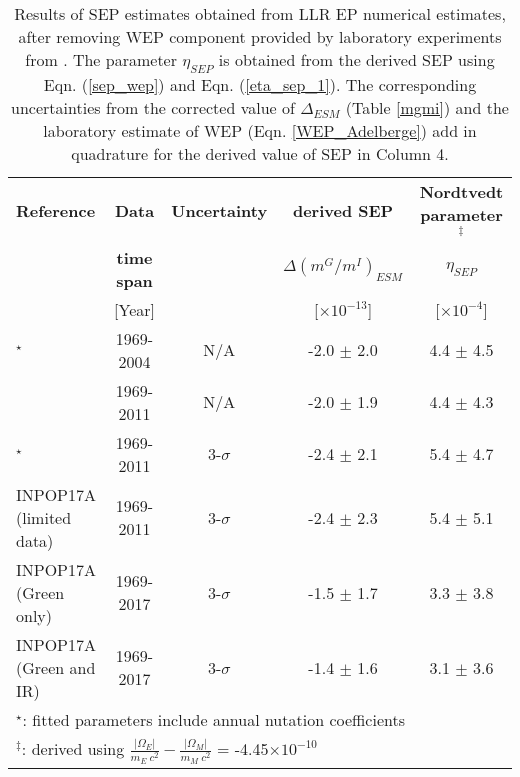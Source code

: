 \documentclass[fleqn,usenatbib,referee]{mnras}
\begin{document}
  \begin{table*}
  \caption{Results of SEP estimates obtained from LLR EP numerical estimates, after removing WEP component provided by laboratory experiments from \protect\cite{Adelberger2001}. The parameter $\eta_{SEP}$ is obtained from the derived SEP using Eqn. (\ref{sep_wep}) and Eqn. (\ref{eta_sep_1}). The corresponding uncertainties from the corrected value of $\Delta_{ESM}$ (Table \ref{mgmi}) and the laboratory estimate of WEP (Eqn. \ref{WEP_Adelberge}) add in quadrature for the derived value of SEP in Column 4.}
  \label{sep_mgmi}
  \begin{tabular}{lcccc}
  \toprule
  \textbf{Reference}              & \textbf{Data}                 & \textbf{Uncertainty}             & \textbf{derived SEP}                           & \textbf{Nordtvedt parameter$^\ddag$}\\
                                               & \textbf{time span}         &                                              & \textbf{$\Delta(m^G/m^I)_{ESM}$} & \textbf{$\eta_{SEP}$} \\ 
                                               &{[}Year{]}                      &                                              & [$\times10^{-13}$]                             & [$\times 10^{-4}$] \\ \midrule
  \cite{Williams2009}$^\star$           & 1969-2004                      & N/A                                      & -2.0 $\pm$ 2.0                                      & 4.4 $\pm$ 4.5   \\
  \cite{Williams2012}           & 1969-2011                      & N/A                                      & -2.0 $\pm$ 1.9                                      & 4.4 $\pm$ 4.3   \\
  \cite{Muller2012}$^\star$               & 1969-2011                      &3-$\sigma$                            & -2.4 $\pm$ 2.1                                      & 5.4 $\pm$ 4.7   \\
  INPOP17A (limited data)    & 1969-2011                     &3-$\sigma$                            & -2.4 $\pm$ 2.3                                      & 5.4 $\pm$ 5.1   \\
  INPOP17A (Green only)     & 1969-2017                     &3-$\sigma$                             & -1.5 $\pm$ 1.7                                    &  3.3 $\pm$ 3.8   \\
  INPOP17A (Green and IR) & 1969-2017                     &3-$\sigma$                             & -1.4 $\pm$ 1.6                                    &  3.1 $\pm$ 3.6  \\ 
  \bottomrule
  \multicolumn{5}{l}{$^\star$: fitted parameters include annual nutation coefficients} \\
  \multicolumn{5}{l}{$^\ddag$: derived using $\frac{|\Omega_E|}{m_E~c^2} - \frac{|\Omega_M|}{m_M~c^2}$ = -4.45$\times10^{-10}$ \protect\cite[Eqn. 6]{Williams2012}}
  \end{tabular}
  \end{table*}

\clearpage

 

\label{lastpage}
\end{document}
